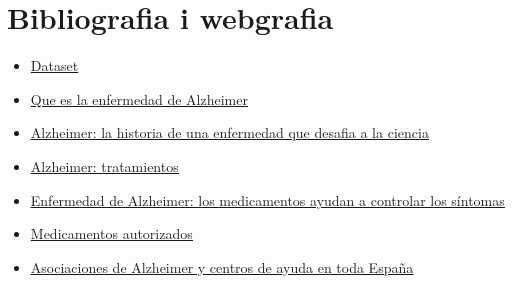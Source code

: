 \documentclass[a4paper,12pt]{article}
\begin{document}
\section*{Bibliografia i webgrafia}
\begin{itemize}
    \item \href{https://www.kaggle.com/datasets/uraninjo/augmented-alzheimer-mri-dataset?resource=download}{\underline{Dataset}}
    \item \href{https://www.alz.org/alzheimer-demencia/que-es-la-enfermedad-de-alzheimer }{\underline{Que es la enfermedad de Alzheimer}}
    \item \href{https://www.caeme.org.ar/alzheimer-la-historia-de-una-enfermedad-que-desafia-a-la-ciencia/}{\underline{Alzheimer: la historia de una enfermedad que desafia a la ciencia }}
    \item \href{https://www.alz.org/alzheimer-demencia/tratamientos}{\underline{Alzheimer: tratamientos}}
    \item \href{https://www.mayoclinic.org/es-es/diseases-conditions/alzheimers-disease/in-depth/alzheimers/art-20048103}{\underline{Enfermedad de Alzheimer: los medicamentos ayudan a controlar los síntomas}}
    \item \href{http://www.alzfae.org/fundacion/549/medicamentos-autorizados}{\underline{Medicamentos autorizados}}
    \item \href{https://aiudo.es/asociaciones-de-alzheimer-y-centros/#asociaciones-de-alzheimer}{\underline{Asociaciones de Alzheimer y centros de ayuda en toda España}}
\end{itemize}
\end{document}
